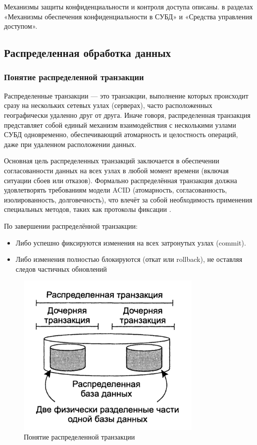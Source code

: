 Механизмы защиты конфиденциальности и контроля доступа  описаны. в разделах «Механизмы обеспечения конфиденциальности в СУБД» и «Средства управления доступом».

\subsection{Распределенная обработка данных}

\subsubsection{Понятие распределенной транзакции}

Распределенные транзакции — это транзакции, выполнение которых происходит сразу на нескольких сетевых узлах (серверах), часто расположенных географически 
удаленно друг от друга. Иначе говоря, распределенная транзакция представляет собой единый механизм взаимодействия с несколькими узлами СУБД одновременно, 
обеспечивающий атомарность и целостность операций, даже при удаленном расположении данных.

Основная цель распределенных транзакций заключается в обеспечении согласованности данных на всех узлах в любой момент времени (включая ситуации сбоев или отказов). 
Формально распределённая транзакция должна удовлетворять требованиям модели ACID (атомарность, согласованность, изолированность, долговечность), что влечёт за собой 
необходимость применения специальных методов, таких как протоколы фиксации \autocite{Tanenbaum}.

По завершении распределённой транзакции: 

\begin{itemize} 
    \item Либо успешно фиксируются изменения на всех затронутых узлах (commit). 
    \item Либо изменения полностью блокируются (откат или rollback), не оставляя следов частичных обновлений 
\end{itemize}

\begin{figure}[h!]
    \centering
    \includegraphics[width=0.8\textwidth]{assets/distributed/Transaction.png}
    \caption{Понятие распределенной транзакции}
\end{figure}

